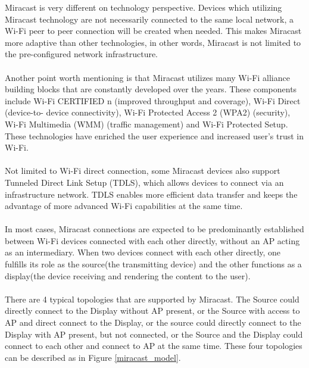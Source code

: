 Miracast \cite{miracast_industry} is very different on technology perspective.
Devices which utilizing Miracast technology are not necessarily connected to
the same local network, a Wi-Fi peer to peer connection will be created when
needed. This makes Miracast more adaptive than other technologies, in other
words, Miracast is not limited to the pre-configured network infrastructure.\\
\\
Another point worth mentioning is that Miracast utilizes many Wi-Fi alliance
building blocks that are constantly developed over the years. These components
include Wi-Fi CERTIFIED n (improved throughput and coverage), Wi-Fi Direct
(device-to- device connectivity), Wi-Fi Protected Access 2 (WPA2) (security),
Wi-Fi Multimedia (WMM) (traffic management) and Wi-Fi Protected Setup. These
technologies have enriched the user experience and increased user's trust in
Wi-Fi.\\
\\
Not limited to Wi-Fi direct connection, some Miracast devices also support Tunneled Direct Link Setup (TDLS), which allows devices to connect via an infrastructure network. TDLS enables more efficient data transfer and keeps the advantage of more advanced Wi-Fi capabilities at the same time.\\
\\
In most cases, Miracast connections are expected to be predominantly established between Wi-Fi devices connected with each other directly, without an AP acting as an intermediary. When two devices connect with each other directly, one fulfills its role as the source(the transmitting device) and the other functions as a display(the device receiving and rendering the content to the user).\\
\\
There are 4 typical topologies that are supported by Miracast. The  Source could directly connect to the Display without AP present, or the Source with access to AP and direct connect to the Display, or the source could directly connect to the Display with AP present, but not connected, or the Source and the Display could connect to each other and connect to AP at the same time. These four topologies can be described as in Figure  \ref{miracast_model}.

